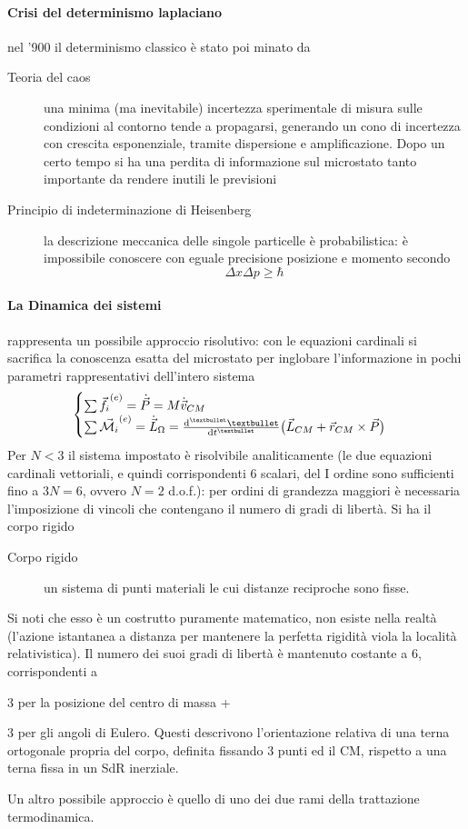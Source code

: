\documentclass[10pt, oneside]{book}
\begin{document}
\paragraph{Crisi del determinismo laplaciano} nel '900 il determinismo classico è stato poi minato da 
\begin{description}
\item[Teoria del caos] una minima (ma inevitabile) incertezza sperimentale di misura sulle condizioni al contorno tende a propagarsi, generando un cono di incertezza con crescita esponenziale, tramite dispersione e amplificazione. Dopo un certo tempo si ha una perdita di informazione sul microstato tanto importante da rendere inutili le previsioni
\item[Principio di indeterminazione di Heisenberg] la descrizione meccanica delle singole particelle è probabilistica: è impossibile conoscere con eguale precisione posizione e momento secondo
\[\Delta x \Delta p \geq \hbar\]
\end{description}
\paragraph{La Dinamica dei sistemi} rappresenta un possibile approccio risolutivo: con le equazioni cardinali si sacrifica la conoscenza esatta del microstato per inglobare l'informazione in pochi parametri rappresentativi dell'intero sistema
\[\begin{cases}
\sum \vec{f_i}^{(e)} = \dot{ \vec{P}} = M \dot{ \vec{v}}_{CM}\\
\sum \vec{\mathcal{M}_i}^{(e)} = \dot{ \vec{L}}_\Omega = \dv[•]{•}{t} \big(\vec{L}_{CM} + \vec{r}_{CM} \times \vec{P}\big)\\
\end{cases}\]
Per $N < 3$ il sistema impostato è risolvibile analiticamente (le due equazioni cardinali vettoriali, e quindi corrispondenti 6 scalari, del I ordine sono sufficienti fino a $3N = 6$, ovvero $N=2$ d.o.f.): per ordini di grandezza maggiori è necessaria l'imposizione di vincoli che contengano il numero di gradi di libertà. Si ha il corpo rigido
\begin{description}
\item[Corpo rigido] un sistema di punti materiali le cui distanze reciproche sono fisse.
\end{description}
Si noti che esso è un costrutto puramente matematico, non esiste nella realtà (l'azione istantanea a distanza per mantenere la perfetta rigidità viola la località relativistica). Il numero dei suoi gradi di libertà è mantenuto costante a $6$, corrispondenti a
\begin{description}
\item 3 per la posizione del centro di massa +
\item 3 per gli angoli di Eulero. Questi descrivono l'orientazione relativa di una terna ortogonale propria del corpo, definita fissando 3 punti ed il CM, rispetto a una terna fissa in un SdR inerziale.
\end{description}
Un altro possibile approccio è quello di uno dei due rami della trattazione termodinamica.
\end{document}
